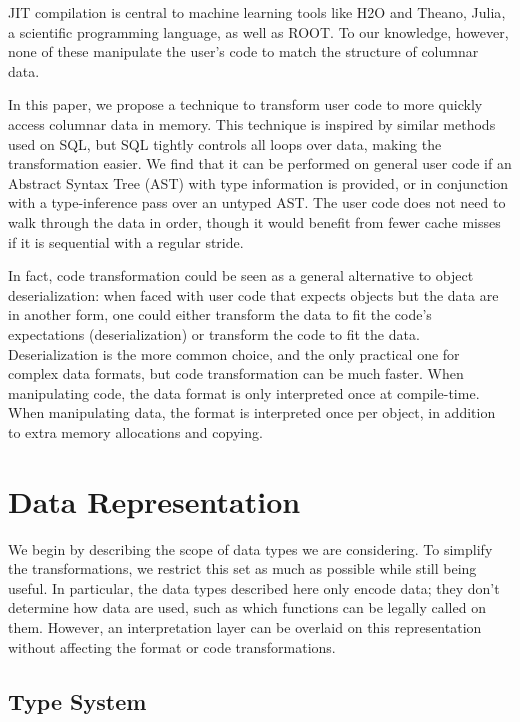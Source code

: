 \documentclass[10pt, conference, compsocconf]{IEEEtran}
\begin{document}
JIT compilation is central to machine learning tools like H2O\cite{h2o} and Theano\cite{theano}, Julia\cite{julia}, a scientific programming language, as well as ROOT. To our knowledge, however, none of these manipulate the user's code to match the structure of columnar data.

In this paper, we propose a technique to transform user code to more quickly access columnar data in memory. This technique is inspired by similar methods used on SQL, but SQL tightly controls all loops over data, making the transformation easier. We find that it can be performed on general user code if an Abstract Syntax Tree (AST) with type information is provided, or in conjunction with a type-inference pass over an untyped AST. The user code does not need to walk through the data in order, though it would benefit from fewer cache misses if it is sequential with a regular stride.

In fact, code transformation could be seen as a general alternative to object deserialization: when faced with user code that expects objects but the data are in another form, one could either transform the data to fit the code's expectations (deserialization) or transform the code to fit the data. Deserialization is the more common choice, and the only practical one for complex data formats, but code transformation can be much faster. When manipulating code, the data format is only interpreted once at compile-time. When manipulating data, the format is interpreted once per object, in addition to extra memory allocations and copying.

\section{Data Representation}

We begin by describing the scope of data types we are considering. To simplify the transformations, we restrict this set as much as possible while still being useful. In particular, the data types described here only encode data; they don't determine how data are used, such as which functions can be legally called on them. However, an interpretation layer can be overlaid on this representation without affecting the format or code transformations.

\subsection{Type System}
\end{document}
